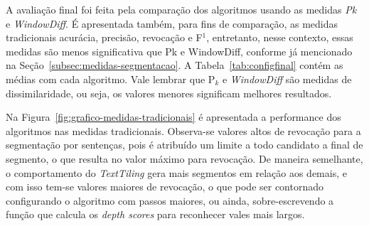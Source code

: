 A avaliação final foi feita pela comparação dos algoritmos usando as medidas \textit{Pk} e \textit{WindowDiff}. É apresentada também, para fins de comparação, as medidas tradicionais acurácia, precisão, revocação e F$^1$, entretanto, nesse contexto, essas medidas são menos significativa que Pk e WindowDiff, conforme já mencionado na Seção~\ref{subsec:medidas-segmentacao}. A Tabela~\ref{tab:configfinal} contém as médias com cada algoritmo. Vale lembrar que P$_k$ e \textit{WindowDiff} são medidas de dissimilaridade, ou seja, os valores menores significam melhores resultados.










Na Figura~\ref{fig:grafico-medidas-tradicionais} é apresentada a performance dos algoritmos nas medidas tradicionais. Observa-se valores altos de revocação para a segmentação por sentenças, pois é atribuído um limite a todo candidato a final de segmento, o que resulta no valor máximo para revocação. De maneira semelhante, o comportamento do \textit{TextTiling} gera 
mais segmentos em relação aos demais, e com isso tem-se valores maiores de revocação, o que pode ser contornado configurando o algoritmo com passos maiores, ou ainda, sobre-escrevendo a função que calcula os \textit{depth scores} para reconhecer vales mais largos.

